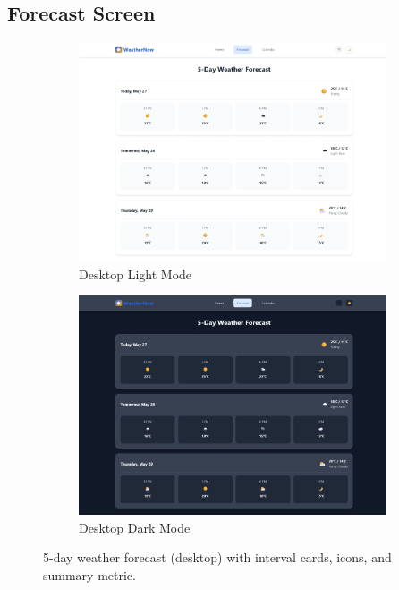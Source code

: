\documentclass[fontsize=13pt,a4paper]{article}
\begin{document}
\subsection{Forecast Screen}
\FloatBarrier
\begin{figure}[H]
  \centering
  \begin{subfigure}{0.48\linewidth}
    \includegraphics[width=\linewidth]{forecast_lightmode.jpeg}
    \caption{Desktop Light Mode}
  \end{subfigure}\hfill
  \begin{subfigure}{0.48\linewidth}
    \includegraphics[width=\linewidth]{forecast_darkmode.jpeg}
    \caption{Desktop Dark Mode}
  \end{subfigure}
  \caption{5-day weather forecast (desktop) with interval cards, icons, and summary metric.}
  \label{fig:forecast_desktop}
\end{figure}
\FloatBarrier
\end{document}
